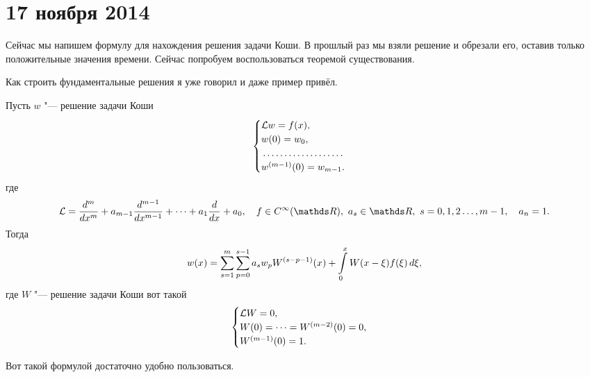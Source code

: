 \section{17 ноября 2014}
Сейчас мы напишем формулу для нахождения решения задачи Коши. В прошлый раз мы взяли решение и обрезали его, оставив только положительные значения времени. Сейчас попробуем воспользоваться теоремой существования.

Как строить фундаментальные решения я уже говорил и даже пример привёл.
\begin{The}
  Пусть $w$ "--- решение задачи Коши 
\begin{equation}\label{zKoshi}
  \begin{cases}
     \L w = f(x),\\
     w(0)=w_0,\\
     \dotfill\\
     w^{(m-1)}(0)=w_{m-1}.
  \end{cases}
\end{equation} где
\[
  \L = \DP{^m}{x^m} + a_{m-1}\DP{^{m-1}}{x^{m-1}}+\dots+a_1\DP{}x+a_0,\quad f\in C^\infty(\R),\ a_s\in\R,\ s=0,1,2\dots,m-1,\quad a_n=1.
\]
Тогда
\begin{equation}\label{stars2}
  w(x) = \sum\limits_{s = 1}^{m}\sum\limits_{p = 0}^{s-1} a_sw_p W^{(s-p-1)}(x) + \int\limits_0^x W(x-\xi)f(\xi) \,d\xi,
\end{equation}
где $W$ "--- решение задачи Коши вот такой
\[
  \begin{cases}\mathcal L W = 0,\\ W(0)=\dots=W^{(m-2)}(0)=0,\\ W^{(m-1)}(0)=1.\end{cases}
\]
\end{The}

Вот такой формулой достаточно удобно пользоваться.

